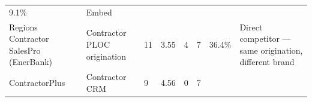 \documentclass[
  10pt,
]{article}
\begin{document}
\begin{longtable}[]{@{}llllllll@{}}
\begin{minipage}[t]{0.10\columnwidth}
9.1\%\strut
\end{minipage} & \begin{minipage}[t]{0.10\columnwidth}\raggedright
Embed\strut
\end{minipage}\tabularnewline
\begin{minipage}[t]{0.10\columnwidth}\raggedright
Regions Contractor SalesPro (EnerBank)\strut
\end{minipage} & \begin{minipage}[t]{0.10\columnwidth}\raggedright
Contractor PLOC origination\strut
\end{minipage} & \begin{minipage}[t]{0.10\columnwidth}\raggedright
11\strut
\end{minipage} & \begin{minipage}[t]{0.10\columnwidth}\raggedright
3.55\strut
\end{minipage} & \begin{minipage}[t]{0.10\columnwidth}\raggedright
4\strut
\end{minipage} & \begin{minipage}[t]{0.10\columnwidth}\raggedright
7\strut
\end{minipage} & \begin{minipage}[t]{0.10\columnwidth}\raggedright
36.4\%\strut
\end{minipage} & \begin{minipage}[t]{0.10\columnwidth}\raggedright
Direct competitor --- same origination, different brand\strut
\end{minipage}\tabularnewline
\begin{minipage}[t]{0.10\columnwidth}\raggedright
ContractorPlus\strut
\end{minipage} & \begin{minipage}[t]{0.10\columnwidth}\raggedright
Contractor CRM\strut
\end{minipage} & \begin{minipage}[t]{0.10\columnwidth}\raggedright
9\strut
\end{minipage} & \begin{minipage}[t]{0.10\columnwidth}\raggedright
4.56\strut
\end{minipage} & \begin{minipage}[t]{0.10\columnwidth}\raggedright
0\strut
\end{minipage} & \begin{minipage}[t]{0.10\columnwidth}\raggedright
7\strut
\end{minipage} & \begin{minipage}[t]{0.10\columnwidth}\raggedright

\end{minipage}
\end{longtable}
\end{document}
